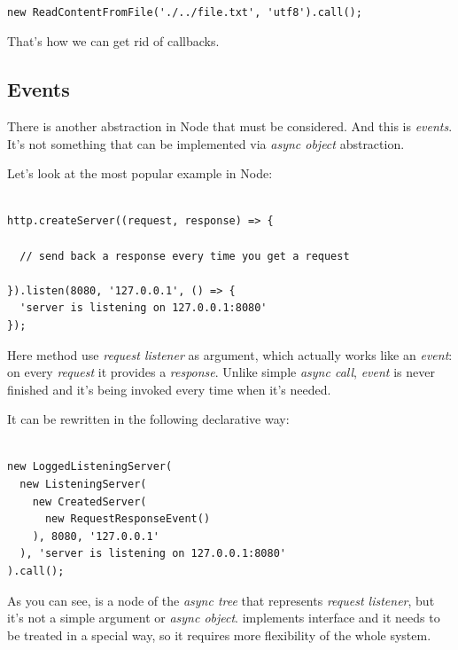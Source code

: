 \documentclass{article}
\newcommand{\cit}[1]{{\fontfamily{qcr}\selectfont{\textit{\textcolor{superdarkgray}{#1}}}}}
\begin{document}
\begin{lstlisting}

new ReadContentFromFile('./../file.txt', 'utf8').call();

\end{lstlisting}

That's how we can get rid of callbacks.

\subsection{Events}

There is another abstraction in Node that must be considered. And this is \textit{events}. It's not something that can be implemented via \textit{async object} abstraction.

Let's look at the most popular example in Node:

\begin{lstlisting}

http.createServer((request, response) => {

  // send back a response every time you get a request

}).listen(8080, '127.0.0.1', () => {
  'server is listening on 127.0.0.1:8080'
});

\end{lstlisting}

Here method \cit{createServer} use \textit{request listener} as argument, which actually works like an \textit{event}: on every \textit{request} it provides a  \textit{response}. Unlike simple \textit{async call}, \textit{event} is never finished and it's being invoked every time when it's needed.

It can be rewritten in the following declarative way:

\begin{lstlisting}

new LoggedListeningServer(
  new ListeningServer(
    new CreatedServer(
      new RequestResponseEvent()
    ), 8080, '127.0.0.1'
  ), 'server is listening on 127.0.0.1:8080'
).call();

\end{lstlisting}

As you can see, \cit{RequestResponseEvent} is a node of the \textit{async tree} that represents \textit{request listener}, but it's not a simple argument or \textit{async object}. \cit{RequestResponseEvent} implements \cit{Event} interface and it needs to be treated in a special way, so it requires more flexibility of the whole system.
\end{document}
